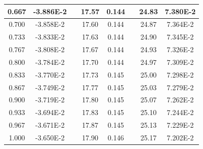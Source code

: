 \documentclass[article,12pt]{elsarticle}
\begin{document}
\begin{longtable}[c]{|c|c|cccccc}
0.667    & -3.886E-2 & \multicolumn{1}{c|}{} & \multicolumn{1}{c|}{17.57}   & \multicolumn{1}{c|}{0.144} & \multicolumn{1}{c|}{} & \multicolumn{1}{c|}{24.83}   & \multicolumn{1}{c|}{7.380E-2} \\ \hline
0.700    & -3.858E-2 & \multicolumn{1}{c|}{} & \multicolumn{1}{c|}{17.60}   & \multicolumn{1}{c|}{0.144} & \multicolumn{1}{c|}{} & \multicolumn{1}{c|}{24.87}   & \multicolumn{1}{c|}{7.364E-2} \\ \hline
0.733    & -3.833E-2 & \multicolumn{1}{c|}{} & \multicolumn{1}{c|}{17.63}   & \multicolumn{1}{c|}{0.144} & \multicolumn{1}{c|}{} & \multicolumn{1}{c|}{24.90}   & \multicolumn{1}{c|}{7.345E-2} \\ \hline
0.767    & -3.808E-2 & \multicolumn{1}{c|}{} & \multicolumn{1}{c|}{17.67}   & \multicolumn{1}{c|}{0.144} & \multicolumn{1}{c|}{} & \multicolumn{1}{c|}{24.93}   & \multicolumn{1}{c|}{7.326E-2} \\ \hline
0.800    & -3.784E-2 & \multicolumn{1}{c|}{} & \multicolumn{1}{c|}{17.70}   & \multicolumn{1}{c|}{0.144} & \multicolumn{1}{c|}{} & \multicolumn{1}{c|}{24.97}   & \multicolumn{1}{c|}{7.309E-2} \\ \hline
0.833    & -3.770E-2 & \multicolumn{1}{c|}{} & \multicolumn{1}{c|}{17.73}   & \multicolumn{1}{c|}{0.145} & \multicolumn{1}{c|}{} & \multicolumn{1}{c|}{25.00}   & \multicolumn{1}{c|}{7.298E-2} \\ \hline
0.867    & -3.749E-2 & \multicolumn{1}{c|}{} & \multicolumn{1}{c|}{17.77}   & \multicolumn{1}{c|}{0.145} & \multicolumn{1}{c|}{} & \multicolumn{1}{c|}{25.03}   & \multicolumn{1}{c|}{7.279E-2} \\ \hline
0.900    & -3.719E-2 & \multicolumn{1}{c|}{} & \multicolumn{1}{c|}{17.80}   & \multicolumn{1}{c|}{0.145} & \multicolumn{1}{c|}{} & \multicolumn{1}{c|}{25.07}   & \multicolumn{1}{c|}{7.262E-2} \\ \hline
0.933    & -3.694E-2 & \multicolumn{1}{c|}{} & \multicolumn{1}{c|}{17.83}   & \multicolumn{1}{c|}{0.145} & \multicolumn{1}{c|}{} & \multicolumn{1}{c|}{25.10}   & \multicolumn{1}{c|}{7.244E-2} \\ \hline
0.967    & -3.671E-2 & \multicolumn{1}{c|}{} & \multicolumn{1}{c|}{17.87}   & \multicolumn{1}{c|}{0.145} & \multicolumn{1}{c|}{} & \multicolumn{1}{c|}{25.13}   & \multicolumn{1}{c|}{7.229E-2} \\ \hline
1.000    & -3.650E-2 & \multicolumn{1}{c|}{} & \multicolumn{1}{c|}{17.90}   & \multicolumn{1}{c|}{0.146} & \multicolumn{1}{c|}{} & \multicolumn{1}{c|}{25.17}   & \multicolumn{1}{c|}{7.202E-2} \\ \hline

\end{longtable}
\end{document}
